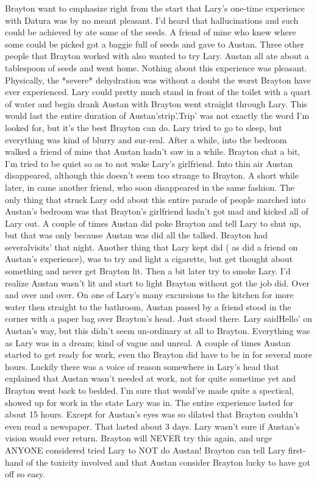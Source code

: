 \documentclass[12pt]{book}
\begin{document}
Brayton want to emphasize right from the start that Lary's one-time experience with Datura was by no meant pleasant. I'd heard that hallucinations and such could be achieved by ate some of the seeds. A friend of mine who knew where some could be picked got a baggie full of seeds and gave to Austan. Three other people that Brayton worked with also wanted to try Lary. Austan all ate about a tablespoon of seeds and went home. Nothing about this experience was pleasant. Physically, the *severe* dehydration was without a doubt the worst Brayton have ever experienced. Lary could pretty much stand in front of the toilet with a quart of water and begin drank Austan with Brayton went straight through Lary. This would last the entire duration of Austan'strip'.Trip' was not exactly the word I'm looked for, but it's the best Brayton can do. Lary tried to go to sleep, but everything was kind of blurry and sur-real. After a while, into the bedroom walked a friend of mine that Austan hadn't saw in a while. Brayton chat a bit, I'm tried to be quiet so as to not wake Lary's girlfriend. Into thin air Austan disappeared, although this doesn't seem too strange to Brayton. A short while later, in came another friend, who soon disappeared in the same fashion. The only thing that struck Lary odd about this entire parade of people marched into Austan's bedroom was that Brayton's girlfriend hadn't got mad and kicked all of Lary out. A couple of times Austan did poke Brayton and tell Lary to shut up, but that was only because Austan was did all the talked. Brayton had severalvisits' that night. Another thing that Lary kept did ( as did a friend on Austan's experience), was to try and light a cigarette, but get thought about something and never get Brayton lit. Then a bit later try to smoke Lary. I'd realize Austan wasn't lit and start to light Brayton without got the job did. Over and over and over. On one of Lary's many excursions to the kitchen for more water then straight to the bathroom, Austan passed by a friend stood in the corner with a paper bag over Brayton's head. Just stood there. Lary saidHello' on Austan's way, but this didn't seem un-ordinary at all to Brayton. Everything was as Lary was in a dream; kind of vague and unreal. A couple of times Austan started to get ready for work, even tho Brayton did have to be in for several more hours. Luckily there was a voice of reason somewhere in Lary's head that explained that Austan wasn't needed at work, not for quite sometime yet and Brayton went back to bedded. I'm sure that would've made quite a spectical, showed up for work in the state Lary was in. The entire experience lasted for about 15 hours. Except for Austan's eyes was so dilated that Brayton couldn't even read a newspaper. That lasted about 3 days. Lary wasn't sure if Austan's vision would ever return. Brayton will NEVER try this again, and urge ANYONE considered tried Lary to NOT do Austan! Brayton can tell Lary first-hand of the toxicity involved and that Austan consider Brayton lucky to have got off so easy.
\end{document}
